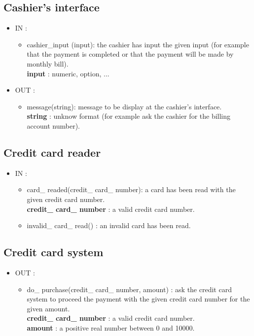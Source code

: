 \documentclass[11pt,a4paper]{article}
\begin{document}
\subsection{Cashier's interface}
\begin{itemize}
\item IN : 
	\begin{itemize}
		\item cashier\_input (input): the cashier has input the given input (for example that the payment is completed or that the payment will be made by monthly bill). \\
		\textbf{input} : numeric, option, ...
	\end{itemize}
\item OUT :
	\begin{itemize}
		\item message(string): message to be display at the cashier’s interface. \\
		\textbf{string} : unknow format (for example ask the cashier for the billing account number).
	\end{itemize}
\end{itemize}


\subsection{Credit card reader}
\begin{itemize}
\item IN : 
	\begin{itemize}
		\item card\_ readed(credit\_ card\_ number): a card has been read with the given credit card number. \\
		\textbf{credit\_ card\_ number} : a valid credit card number.
		\item invalid\_ card\_ read() : an invalid card has been read.
	\end{itemize}
\end{itemize}

\subsection{Credit card system}
\begin{itemize}
\item OUT : 
	\begin{itemize}
		\item  do\_ purchase(credit\_ card\_ number, amount) : ask the credit card system to proceed the payment with the given credit card number for the given amount. \\
		\textbf{credit\_ card\_ number} : a valid credit card number. \\
		\textbf{amount} : a positive real number between 0 and 10000.
	\end{itemize}
\end{itemize}
\end{document}
